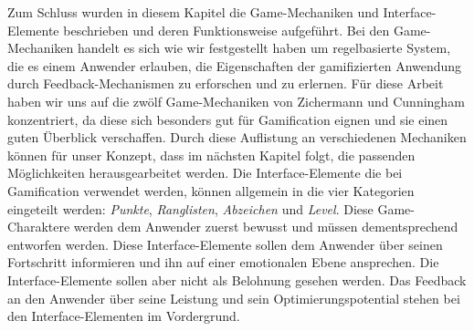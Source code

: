 \documentclass[a4paper,12pt,twoside]{scrartcl}
\begin{document}
Zum Schluss wurden in diesem Kapitel die Game-Mechaniken und Interface-Elemente beschrieben und deren Funktionsweise aufgeführt. Bei den Game-Mechaniken handelt es sich wie wir festgestellt haben um regelbasierte System, die es einem Anwender erlauben, die Eigenschaften der gamifizierten Anwendung durch Feedback-Mechanismen zu erforschen und zu erlernen. Für diese Arbeit haben wir uns auf die zwölf Game-Mechaniken von Zichermann und Cunningham \cite{Zichermann2011} konzentriert, da diese sich besonders gut für Gamification eignen und sie einen guten Überblick verschaffen. Durch diese Auflistung an verschiedenen Mechaniken können für unser Konzept, dass im nächsten Kapitel folgt, die passenden Möglichkeiten herausgearbeitet werden. Die Interface-Elemente die bei Gamification verwendet werden, können allgemein in die vier Kategorien eingeteilt werden: \textit{Punkte}, \textit{Ranglisten}, \textit{Abzeichen} und \textit{Level}. Diese Game-Charaktere werden dem Anwender zuerst bewusst und müssen dementsprechend entworfen werden. Diese Interface-Elemente sollen dem Anwender über seinen Fortschritt informieren und ihn auf einer emotionalen Ebene ansprechen. Die Interface-Elemente sollen aber nicht als Belohnung gesehen werden. Das Feedback an den Anwender über seine Leistung und sein Optimierungspotential stehen bei den Interface-Elementen im Vordergrund. 
\newpage
\end{document}
